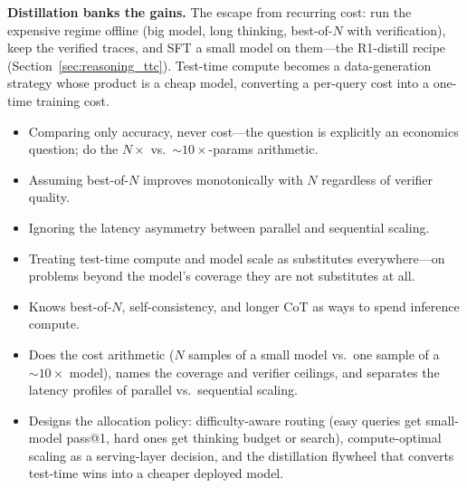 \begin{interviewq}
\textbf{Distillation banks the gains.} The escape from recurring cost: run the expensive regime offline (big model, long thinking, best-of-$N$ with verification), keep the verified traces, and SFT a small model on them---the R1-distill recipe (Section~\ref{sec:reasoning_ttc}). Test-time compute becomes a data-generation strategy whose product is a cheap model, converting a per-query cost into a one-time training cost.

\redflags
\begin{itemize}
    \item Comparing only accuracy, never cost---the question is explicitly an economics question; do the $N\times$ vs.\ $\sim 10\times$-params arithmetic.
    \item Assuming best-of-$N$ improves monotonically with $N$ regardless of verifier quality.
    \item Ignoring the latency asymmetry between parallel and sequential scaling.
    \item Treating test-time compute and model scale as substitutes everywhere---on problems beyond the model's coverage they are not substitutes at all.
\end{itemize}


\goodgreat
\begin{itemize}
    \item {} Knows best-of-$N$, self-consistency, and longer CoT as ways to spend inference compute.
    \item {} Does the cost arithmetic ($N$ samples of a small model vs.\ one sample of a $\sim 10\times$ model), names the coverage and verifier ceilings, and separates the latency profiles of parallel vs.\ sequential scaling.
    \item {} Designs the allocation policy: difficulty-aware routing (easy queries get small-model pass@1, hard ones get thinking budget or search), compute-optimal scaling as a serving-layer decision, and the distillation flywheel that converts test-time wins into a cheaper deployed model.
\end{itemize}

\end{interviewq}
